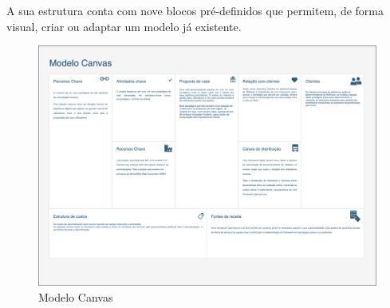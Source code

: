 A sua estrutura conta com nove blocos pré-definidos que permitem, de forma visual, criar ou adaptar um modelo já existente\cite{alexander:2006}.
\begin{figure}[h]
    \begin{center}
    \includegraphics[width=1 \textwidth, angle=90]{figures/Canvas-Canvas.png}
    \caption{Modelo Canvas}
    \end{center}
\end{figure}
